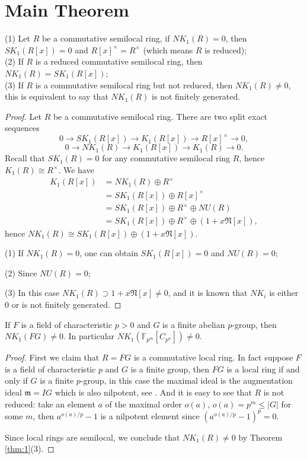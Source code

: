 \section{Main Theorem} %
\label{sec:main_theorem}
\begin{theorem}
\label{thm:1}
	(1) Let $R$ be a commutative semilocal ring, if $NK_1(R)=0$, then $SK_1(R[x])=0$ and $R[x]^{\times}=R^{\times}$ (which means $R$ is reduced);\\
	(2) If $R$ is a reduced commutative semilocal ring, then $NK_1(R)=SK_1(R[x])$;\\
	(3) If $R$ is a commutative semilocal ring but not reduced, then $NK_1(R)\neq 0$, this is equivalent to say that $NK_1(R)$ is not finitely generated.\\
\end{theorem}
\begin{proof}
	Let $R$ be a commutative semilocal ring. There are two split exact sequences
\[0\longrightarrow SK_1(R[x])\longrightarrow K_1(R[x])\longrightarrow R[x]^{\times}\longrightarrow 0, \]
\[0\longrightarrow NK_1(R)\longrightarrow K_1(R[x])\longrightarrow K_1(R)\longrightarrow 0. \]
Recall that $SK_1(R)=0$ for any commutative semilocal ring $R$, hence $K_1(R)\cong R^{\times}$.
We have
\begin{align*}
K_1(R[x]) & = NK_1(R)\oplus R^{\times} \\
		& = SK_1(R[x]) \oplus R[x]^{\times}\\
		& = SK_1(R[x]) \oplus R^{\times} \oplus NU(R)\\
		& = SK_1(R[x]) \oplus R^{\times} \oplus (1 + x\mathfrak{N}[x]),
\end{align*}
hence $NK_1(R)\cong SK_1(R[x])\oplus (1 + x\mathfrak{N}[x])$.

(1) If $NK_1(R)=0$, one can obtain $SK_1(R[x])=0$ and $NU(R)=0$;

(2) Since $NU(R)=0$;

(3) In this case $NK_1(R)\supset 1 + x\mathfrak{N}[x]\neq 0$, and it is known that $NK_i$ is either $0$ or is not finitely generated.
\end{proof}

\begin{theorem}
	If $F$ is a field of characteristic $p>0$ and $G$ is a finite abelian $p$-group, then $NK_1(FG)\neq 0$. In particular $NK_1(\mathbb{F}_{p^m}[C_{p^n}]) \neq 0$.
\end{theorem}
\begin{proof}
	First we claim that $R=FG$ is a commutative local ring. In fact suppose $F$ is a field of characteristic $p$ and $G$ is a finite group, then $FG$ is a local ring if and only if $G$ is a finite $p$-group, in this case the maximal ideal is the augmentation ideal $\mathfrak{m}=IG$ which is also nilpotent, see \cite{Iyengar2010Modules}. And it is easy to see that $R$ is not reduced: take an element $a$ of the maximal order $o(a)$, $o(a)= p^m \leq |G|$ for some $m$, then $a^{o(a)/p}-1$ is a nilpotent element since $(a^{o(a)/p}-1)^p=0$.

	Since local rings are semilocal, we conclude that $NK_1(R)\neq 0$ by Theorem \ref{thm:1}(3).
\end{proof}


